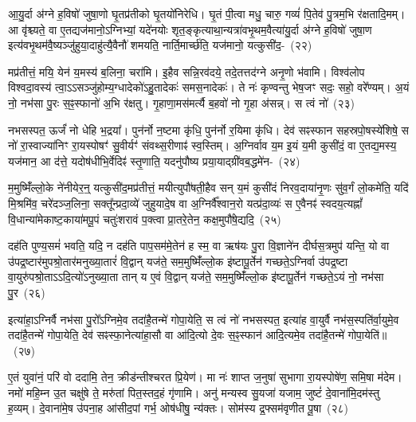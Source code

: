 {\anuvakamend[{स छन्द॑सां वी॒र्यं॑ वा ए॒व तद॒ष्टौ च॑}]}%

आ॒यु॒र्दा अ॑ग्ने ह॒विषो॑ जुषा॒णो घृ॒तप्र॑तीको घृ॒तयो॑निरेधि। घृ॒तं पी॒त्वा मधु॒ चारु॒ गव्यं॑ पि॒तेव॑ पु॒त्रम॒भि र॑क्षतादि॒मम्। आ वृ॑श्च्यते॒ वा ए॒तद्यज॑मानो॒\-ऽग्निभ्यां॒ यदे॑नयोः शृत॒ङ्कृत्याथा॒न्यत्रा॑वभृ॒थम॒वैत्या॑यु॒र्दा अ॑ग्ने ह॒विषो॑ जुषा॒ण इत्य॑वभृ॒थम॑वै॒ष्यञ्जु॑हुया॒दाहु॑त्यै॒वैनौ॑ शमयति॒ नार्ति॒मार्च्छ॑ति॒ यज॑मानो॒ यत्कुसी॑द॒-~(२२)

मप्र॑तीत्तं॒ मयि॒ येन॑ य॒मस्य॑ ब॒लिना॒ चरा॑मि। इ॒हैव सन्नि॒रव॑दये॒ तदे॒तत्तद॑ग्ने अनृ॒णो भ॑वामि। विश्व॑लोप विश्वदा॒वस्य॑ त्वा॒\-ऽऽ\-सञ्जु॑होम्य॒ग्धादेको॑\-ऽहु॒तादेकः॑ समस॒नादेकः॑। ते नः॑ कृण्वन्तु भेष॒जꣳ सदः॒ सहो॒ वरे᳚ण्यम्। अ॒यं नो॒ नभ॑सा पु॒रः स॒ꣴ॒स्फानो॑ अ॒भि र॑क्षतु। गृ॒हाणा॒मस॑मर्त्यै ब॒हवो॑ नो गृ॒हा अ॑सन्न्। स त्वं नो॑~(२३)

नभसस्पत॒ ऊर्जं॑ नो धेहि भ॒द्रया᳚। पुन॑र्नो न॒ष्टमा कृ॑धि॒ पुन॑र्नो र॒यिमा कृ॑धि। देव॑ सꣴस्फान सहस्रपो॒षस्ये॑शिषे॒ स नो॑ रा॒स्वाज्या॑निꣳ रा॒यस्पोषꣳ॑ सु॒वीर्यꣳ॑ संवथ्स॒रीणाꣴ॑ स्व॒स्तिम्। अ॒ग्निर्वाव य॒म इ॒यं य॒मी कुसी॑दं॒ वा ए॒तद्य॒मस्य॒ यज॑मान॒ आ द॑त्ते॒ यदोष॑धीभि॒र्वेदिꣴ॑ स्तृ॒णाति॒ यदनु॑पौष्य प्रया॒याद्ग्री॑वब॒द्धमे॑न-~(२४)

म॒मुष्मिँ॑ल्लो॒के ने॑नीयेर॒न्॒ यत्कुसी॑द॒मप्र॑तीत्तं॒ मयीत्युपौ॑षती॒हैव सन् य॒मं कुसी॑दं निरव॒दाया॑नृ॒णः सु॑व॒र्गं लो॒कमे॑ति॒ यदि॑ मि॒श्रमि॑व॒ चरे॑दञ्ज॒लिना॒ सक्तू᳚न्प्रदा॒व्ये॑ जुहुयादे॒ष वा अ॒ग्निर्वै᳚श्वान॒रो यत्प्र॑दा॒व्यः॑ स ए॒वैनꣴ॑ स्वदय॒त्यह्नां᳚ वि॒धान्या॑मेकाष्ट॒काया॑मपू॒पं चतुः॑शरावं प॒क्त्वा प्रा॒तरे॒तेन॒ कक्ष॒मुपौ॑षे॒द्यदि॒~(२५)

दह॑ति पुण्य॒समं॑ भवति॒ यदि॒ न दह॑ति पाप॒सम॑मे॒तेन॑ ह स्म॒ वा ऋष॑यः पु॒रा वि॒ज्ञाने॑न दीर्घस॒त्रमुप॑ यन्ति॒ यो वा उ॑पद्र॒ष्टार॑मुपश्रो॒तार॑मनुख्या॒तारं॑ वि॒द्वान् यज॑ते॒ सम॒मुष्मिँ॑ल्लो॒क इ॑ष्टापू॒र्तेन॑ गच्छते॒\-ऽग्निर्वा उ॑पद्र॒ष्टा वा॒युरु॑पश्रो॒ता\-ऽऽ\-\-दि॒त्यो॑\-ऽनुख्या॒ता तान् य ए॒वं वि॒द्वान् यज॑ते॒ सम॒मुष्मिँ॑ल्लो॒क इ॑ष्टापू॒र्तेन॑ गच्छते॒\-ऽयं नो॒ नभ॑सा पु॒र~(२६)

इत्या॑हा॒\-ऽग्निर्वै नभ॑सा पु॒रो᳚\-ऽग्निमे॒व तदा॑है॒तन्मे॑ गोपा॒येति॒ स त्वं नो॑ नभसस्पत॒ इत्या॑ह वा॒युर्वै नभ॑स॒स्पति॑र्वा॒युमे॒व तदा॑है॒तन्मे॑ गोपा॒येति॒ देव॑ सꣴस्फा॒नेत्या॑हा॒सौ वा आ॑दि॒त्यो दे॒वः स॒ꣴ॒स्फान॑ आदि॒त्यमे॒व तदा॑है॒तन्मे॑ गोपा॒येति॑॥~(२७)

{\anuvakamend[{कुसी॑द॒न्त्वन्न॑ एनमोषे॒द्यदि॑ पु॒र आ॑दि॒त्यमे॒व तदा॑है॒तन्मे॑ गोपा॒येति॑}]}%

ए॒तं युवा॑नं॒ परि॑ वो ददामि॒ तेन॒ क्रीड॑न्तीश्चरत प्रि॒येण॑। मा नः॑ शाप्त ज॒नुषा॑ सुभागा रा॒यस्पोषे॑ण॒ समि॒षा म॑देम। नमो॑ महि॒म्न उ॒त चक्षु॑षे ते॒ मरु॑तां पित॒स्तद॒हं गृ॑णामि। अनु॑ मन्यस्व सु॒यजा॑ यजाम॒ जुष्टं॑ दे॒वाना॑मि॒दम॑स्तु ह॒व्यम्। दे॒वाना॑मे॒ष उ॑पना॒ह आ॑सीद॒पां गर्भ॒ ओष॑धीषु॒ न्य॑क्तः। सोम॑स्य द्र॒फ्सम॑वृणीत पू॒षा~(२८)

